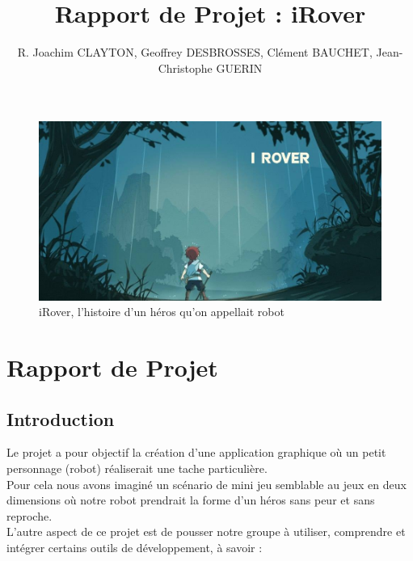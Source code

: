\documentclass[a4paper 12pts]{article}
\title{Rapport de Projet : iRover}
\author{R. Joachim CLAYTON, Geoffrey DESBROSSES, Clément BAUCHET, Jean-Christophe GUERIN }
\begin{document}
\maketitle


\begin{figure}[h]
   \includegraphics[width=350pt]{Illustration/proj_irover.jpg}
	\caption{iRover, l'histoire d'un héros qu'on appellait robot}
\end{figure}



\newpage


\renewcommand{\contentsname}{Sommaire} 
\tableofcontents

\newpage








\section{Rapport de Projet}


\vspace{2cm}



\subsection{Introduction}

Le projet a pour objectif la création d'une application graphique où un petit personnage (robot) réaliserait une tache particulière.\\
Pour cela nous avons imaginé un scénario de mini jeu semblable au jeux en deux dimensions où notre robot prendrait la forme d'un héros sans peur et sans reproche.\\
L'autre aspect de ce projet est de pousser notre groupe à utiliser, comprendre et intégrer certains outils de développement, à savoir : 
\end{document}
